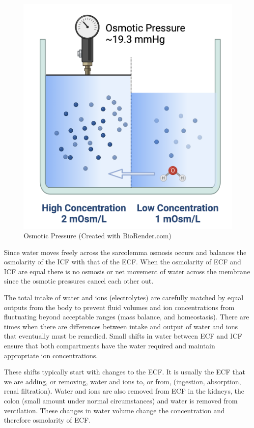 \begin{figure}[!h]
    \centering
    \includegraphics[width=0.5\linewidth]{./figure/osmotic_pressure.png}
    \caption{Osmotic Pressure \footnotesize{(Created with BioRender.com)}}
    \label{fig:osmotic_pressure}
\end{figure}

Since water moves freely across the sarcolemma osmosis occurs and balances the osmolarity of the ICF with that of the ECF. When the osmolarity of ECF and ICF are equal there is no osmosis or net movement of water across the membrane since the osmotic pressures cancel each other out.

The total intake of water and ions (electrolytes) are carefully matched by equal outputs from the body to prevent fluid volumes and ion concentrations from fluctuating beyond acceptable ranges (mass balance, and homeostasis). There are times when there are differences between intake and output of water and ions that eventually must be remedied. Small shifts in water between ECF and ICF ensure that both compartments have the water required and maintain appropriate ion concentrations.

These shifts typically start with changes to the ECF. It is usually the ECF that we are adding, or removing, water and ions to, or from, (ingestion, absorption, renal filtration). Water and ions are also removed from ECF in the kidneys, the colon (small amount under normal circumstances) and water is removed from ventilation.  These changes in water volume change the concentration and therefore osmolarity of ECF. 


